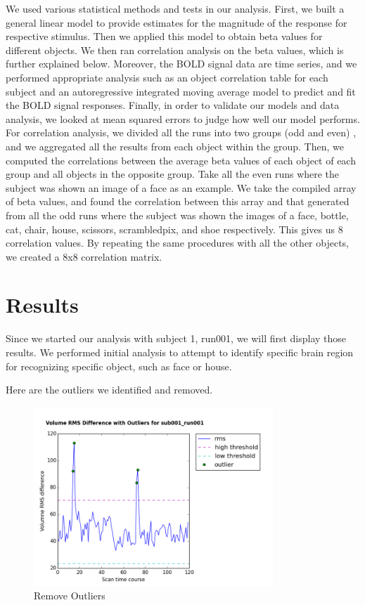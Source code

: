 \documentclass[11pt,twocolumn]{article}
\begin{document}
We used various statistical methods and tests in our analysis. First,
we built a general linear model to provide estimates for the magnitude of
the response for respective stimulus. Then we applied this model to obtain
beta values for different objects. We then ran correlation analysis on the
beta values, which is further explained below. Moreover, the BOLD signal 
data are time series, and we performed appropriate analysis such as 
an object correlation table for each subject and an autoregressive integrated
moving average model to predict and fit the BOLD signal responses. 
Finally, in order to validate our models and data analysis, we looked 
at mean squared errors to judge how well our model performs. \\

For correlation analysis, we divided all the runs into two groups (odd and even)
, and we aggregated all the results from each object within the group. Then, 
we computed the correlations between the average beta values of each object 
of each group and all objects in the opposite group. Take all the even runs 
where the subject was shown an image of a face as an example. We take 
the compiled array of beta values, and found the correlation between this 
array and that generated from all the odd runs where the subject was shown 
the images of a face, bottle, cat, chair, house, scissors, scrambledpix, and 
shoe respectively. This gives us 8 correlation values. By repeating the same 
procedures with all the other objects, we created a 8x8 correlation matrix. \\

\section{Results}

Since we started our analysis with subject 1, run001, we will first display those
results. We performed initial analysis to attempt to identify specific brain region 
for recognizing specific object, such as face or house. 

Here are the outliers we identified and removed. \\
\begin{figure}[h!]
\centering
\includegraphics[width=90mm]{Volume_RMS_Difference_Outliers_sub001_run001.png}
\caption{Remove Outliers}
\end{figure}
\end{document}
